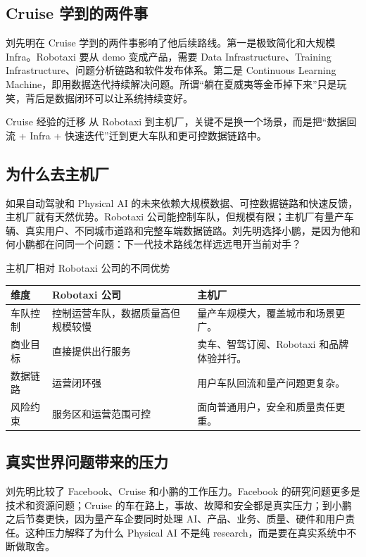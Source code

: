\documentclass[a4paper]{article}
\begin{document}
\subsection{Cruise 学到的两件事}

刘先明在 Cruise 学到的两件事影响了他后续路线。第一是极致简化和大规模 Infra。Robotaxi 要从 demo 变成产品，需要 Data Infrastructure、Training Infrastructure、问题分析链路和软件发布体系。第二是 Continuous Learning Machine，即用数据迭代持续解决问题。所谓“躺在夏威夷等金币掉下来”只是玩笑，背后是数据闭环可以让系统持续变好。

\begin{importantbox}{Cruise 经验的迁移}
从 Robotaxi 到主机厂，关键不是换一个场景，而是把“数据回流 + Infra + 快速迭代”迁到更大车队和更可控数据链路中。
\end{importantbox}

\subsection{为什么去主机厂}

如果自动驾驶和 Physical AI 的未来依赖大规模数据、可控数据链路和快速反馈，主机厂就有天然优势。Robotaxi 公司能控制车队，但规模有限；主机厂有量产车辆、真实用户、不同城市道路和完整车端数据链路。刘先明选择小鹏，是因为他和何小鹏都在问同一个问题：下一代技术路线怎样远远甩开当前对手？

\begin{knowledgebox}{主机厂相对 Robotaxi 公司的不同优势}
\begin{tabularx}{\textwidth}{p{}p{}X}
\toprule
维度 & Robotaxi 公司 & 主机厂 \\
\midrule
车队控制 & 控制运营车队，数据质量高但规模较慢 & 量产车规模大，覆盖城市和场景更广。 \\
商业目标 & 直接提供出行服务 & 卖车、智驾订阅、Robotaxi 和品牌体验并行。 \\
数据链路 & 运营闭环强 & 用户车队回流和量产问题更复杂。 \\
风险约束 & 服务区和运营范围可控 & 面向普通用户，安全和质量责任更重。 \\
\bottomrule
\end{tabularx}
\end{knowledgebox}

\subsection{真实世界问题带来的压力}

刘先明比较了 Facebook、Cruise 和小鹏的工作压力。Facebook 的研究问题更多是技术和资源问题；Cruise 的车在路上，事故、故障和安全都是真实压力；到小鹏之后节奏更快，因为量产车企要同时处理 AI、产品、业务、质量、硬件和用户责任。这种压力解释了为什么 Physical AI 不是纯 research，而是要在真实系统中不断做取舍。
\end{document}
